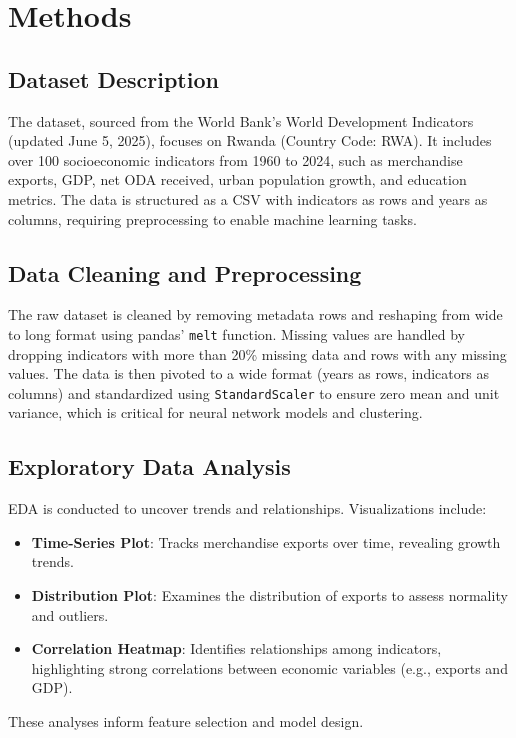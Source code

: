 \documentclass[12pt]{article}
\begin{document}
	\section{Methods}
	
	\subsection{Dataset Description}
	The dataset, sourced from the World Bank's World Development Indicators (updated June 5, 2025), focuses on Rwanda (Country Code: RWA). It includes over 100 socioeconomic indicators from 1960 to 2024, such as merchandise exports, GDP, net ODA received, urban population growth, and education metrics. The data is structured as a CSV with indicators as rows and years as columns, requiring preprocessing to enable machine learning tasks.
	
	\subsection{Data Cleaning and Preprocessing}
	The raw dataset is cleaned by removing metadata rows and reshaping from wide to long format using pandas' \texttt{melt} function. Missing values are handled by dropping indicators with more than 20\% missing data and rows with any missing values. The data is then pivoted to a wide format (years as rows, indicators as columns) and standardized using \texttt{StandardScaler} to ensure zero mean and unit variance, which is critical for neural network models and clustering.
	
	\subsection{Exploratory Data Analysis}
	EDA is conducted to uncover trends and relationships. Visualizations include:
	\begin{itemize}
		\item \textbf{Time-Series Plot}: Tracks merchandise exports over time, revealing growth trends.
		\item \textbf{Distribution Plot}: Examines the distribution of exports to assess normality and outliers.
		\item \textbf{Correlation Heatmap}: Identifies relationships among indicators, highlighting strong correlations between economic variables (e.g., exports and GDP).
	\end{itemize}
	These analyses inform feature selection and model design.
	
\end{document}
